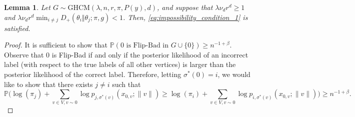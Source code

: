 \documentclass{article}
\renewcommand{\P}{\mathbb{P}}
\newcommand{\1}{\mathbbm{1}}
\theoremstyle{definition}
\theoremstyle{plain}
\newtheorem{lemma}{Lemma}
\begin{document}
\begin{lemma}
\label{lem:impossibility_lemma_1}
    Let $G \sim \text{GHCM}(\lambda, n, r, \pi, P(y), d)$, and suppose that $\lambda \nu_d r^d \geq 1$ and $\lambda \nu_d r^d \min_{i \neq j} D_+(\theta_i \Vert \theta_j; \pi, g) < 1$. Then, \eqref{eq:impossibility_condition_1} is satisfied.
\end{lemma}
\begin{proof}
    It is sufficient to show that $\P(0 \text{ is Flip-Bad in } G \cup \{0\}) \geq n^{-1 + \beta}$. Observe that 0 is Flip-Bad if and only if the posterior likelihood of an incorrect label (with respect to the true labels of all other vertices) is larger than the posterior likelihood of the correct label. Therefore, letting $\sigma^*(0) = i$, we would like to show that there exists $j \neq i$ such that
    \begin{equation}
    \label{eq:0_is_FlipBad}
        \P\bigg( \log(\pi_j) + \sum_{v \in V, v \sim 0} \log p_{j, \sigma^*(v)}(x_{0, v}; \|v\|) \geq \log(\pi_i) + \sum_{v \in V, v \sim 0} \log p_{i, \sigma^*(v)}(x_{0, v}; \|v\|) \bigg) \geq n^{-1+\beta}.
    \end{equation}


\end{proof}
\end{document}
